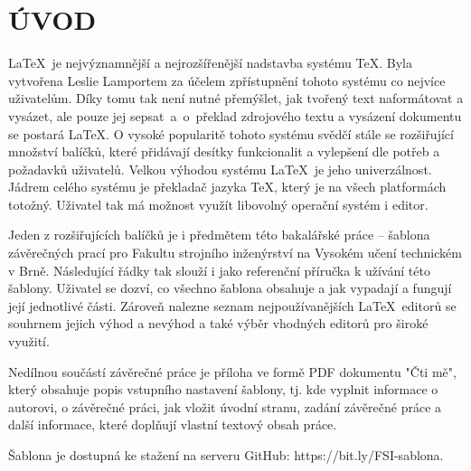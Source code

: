 
\chapter*{ÚVOD}
{}

\LaTeX\ je nejvýznamnější a nejrozšířenější nadstavba systému \TeX. Byla vytvořena Leslie Lamportem za účelem zpřístupnění tohoto systému co nejvíce uživatelům. Díky tomu tak není nutné přemýšlet, jak tvořený text naformátovat a vysázet, ale pouze jej sepsat~a~o~překlad zdrojového textu a vysázení dokumentu se postará \LaTeX. O vysoké popularitě tohoto systému svědčí stále se rozšiřující množství balíčků, které přidávají desítky funkcionalit a vylepšení dle potřeb a požadavků uživatelů. Velkou výhodou systému \LaTeX\ je jeho univerzálnost. Jádrem celého systému je překladač jazyka \TeX, který je na všech platformách totožný. Uživatel tak má možnost využít libovolný operační systém i editor.

Jeden z rozšiřujících balíčků je i předmětem této bakalářské práce -- šablona závěrečných prací pro Fakultu strojního inženýrství na Vysokém učení technickém v Brně. Následující řádky tak slouží i jako referenční příručka k užívání této šablony. Uživatel se dozví, co všechno šablona obsahuje a jak vypadají a fungují její jednotlivé části. Zároveň nalezne seznam nejpoužívanějších \LaTeX\ editorů se souhrnem jejich výhod a nevýhod a také výběr vhodných editorů pro široké využití.

Nedílnou součástí závěrečné práce je příloha ve formě PDF dokumentu "Čti mě", který obsahuje popis vstupního nastavení šablony, tj. kde vyplnit informace o autorovi, o závěrečné práci, jak vložit úvodní stranu, zadání závěrečné práce a další informace, které doplňují vlastní textový obsah práce.

Šablona je dostupná ke stažení na serveru GitHub: https://bit.ly/FSI-sablona.

